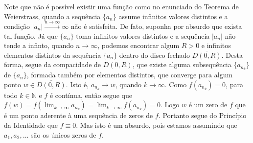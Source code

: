     Note que não é possível existir uma função como no enunciado do Teorema
    de Weierstrass, quando a sequência $\{a_n\}$ assume infinitos valores distintos e
    a condição $|a_n| \xrightarrow{n\to\infty} \infty$ não é satisfeita.
    De fato, suponha por absurdo que exista tal função. 
    Já que $\{a_n\}$ toma infinitos valores distintos e 
    a sequência $|a_n|$ não tende a infinto, quando $n\to \infty$,
    podemos encontrar algum $R>0$ e infinitos elementos distintos 
    da sequência $\{a_n\}$ dentro do disco fechado $\overline{D(0,R)}$. 
    Desta forma, segue da compacidade de $\overline{D(0,R)}$, 
    que existe alguma 
    subsequência $\{a_{n_{k}}\}$ de $\{a_n\}$, formada também
    por elementos distintos, que converge
    para algum ponto $w\in \overline{D(0,R)}$.
    Isto é, $a_{n_{k}}\to w$, quando $k\to\infty$.
    Como $f(a_{n_{k}})=0$, para  todo $k\in\mathbb{N}$ 
    e $f$ é contínua, então segue que 
    $f(w)=f(\lim_{k\to\infty} a_{n_k})=\lim_{k\to\infty} f(a_{n_k}) =0$.  
    Logo $w$ é um zero de $f$ que é um ponto aderente à uma 
    sequência de zeros de $f$. Portanto segue do Princípio da Identidade 
    que $f\equiv 0$. Mas isto é um absurdo, pois estamos assumindo 
    que $a_1, a_2, \dots$ são os únicos zeros de $f$.
 
 
 \bigskip 
 
